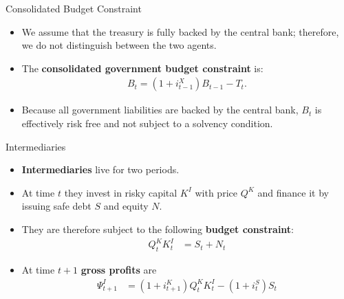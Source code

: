 \documentclass[11pt,aspectratio=169]{beamer}
\begin{document}

\begin{frame}{Consolidated Budget Constraint}
\small
\begin{itemize}

\item We assume that the treasury is fully backed by the central bank; therefore, we do not distinguish between the two agents.

\item The \textbf{consolidated government budget constraint} is:
\begin{align}
B_t = (1+i_{t-1}^X) B_{t-1} - T_t.
\label{4.7}
\end{align}

\item Because all government liabilities are backed by the central bank, $B_t$ is effectively risk free and not subject to a solvency condition.

\end{itemize}
\end{frame}

\begin{frame}{Intermediaries}
\begin{itemize}
    \item \textbf{Intermediaries} live for two periods. 
    \item At time $t$ they invest in risky capital $K^I$ with price $Q^K$ and finance it by issuing safe debt $S$ and equity $N$.
    \item They are therefore subject to the following \textbf{budget constraint}: 
\begin{align}
    Q_t^K K_t^I &= S_t + N_t  \label{4.8}
\end{align}
\item At time $t+1$ \textbf{gross profits} are
\begin{align}
    \Psi_{t+1}^I &= (1+i_{t+1}^K)Q_t^K K_t^I - (1+i_t^S)S_t  \label{4.9}
\end{align}
\end{itemize}
\end{frame}
\end{document}
